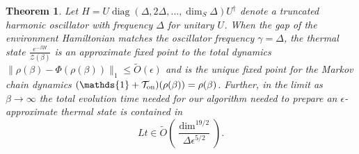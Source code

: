 \documentclass{article}
\newtheorem{theorem}{Theorem}
\newcommand{\on}{\rm on}
\newcommand{\parens}[1]{\left( #1 \right)}
\newcommand{\norm}[1]{\| #1 \|}
\newcommand{\partfun}{\mathcal{Z}}
\newcommand{\identity}{\mathds{1}}
\DeclareMathOperator{\diag}{diag}
\begin{document}
\begin{theorem}\label{thm:harmonic_oscillator}
    Let $H = U \diag(\Delta , 2 \Delta , \ldots, \dim_S \Delta) U^\dagger$ denote a truncated harmonic oscillator with frequency $\Delta$ for unitary $U$. When the gap of the environment Hamiltonian matches the oscillator frequency $\gamma = \Delta$, the thermal state $\frac{e^{-\beta H}}{\partfun(\beta)}$ is an approximate fixed point to the total dynamics $\norm{\rho(\beta) - \Phi(\rho(\beta))}_1 \le \widetilde{O}(\epsilon)$ and is the unique fixed point for the Markov chain dynamics $(\identity + \mathcal{T}_{\on})(\rho(\beta)) = \rho(\beta)$. Further, in the limit as $\beta \to \infty$ %
    the total evolution time needed for our algorithm needed to prepare an $\epsilon$-approximate thermal state is contained in 
    $$L t \in \widetilde{O} \parens{\frac{\dim^{19/2}}{\Delta \epsilon^{5/2}} }.$$

\end{theorem}
\end{document}
